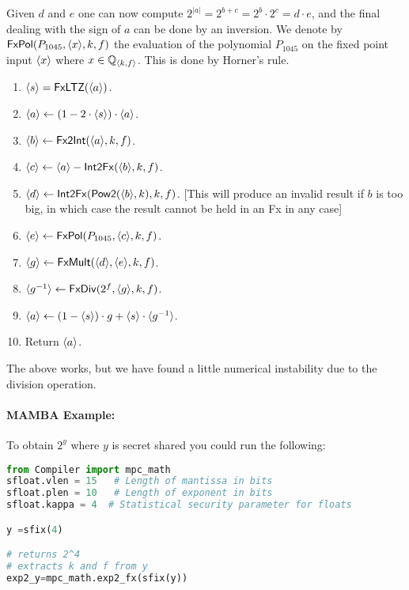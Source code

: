   Given $d$ and $e$ one can now compute
$2^{|a|}=2^{b+c}=2^b \cdot 2^c=d \cdot e$,
  and the final dealing with the sign of $a$ can
  be done by an inversion.
  We denote by $\mathsf{FxPol}(P_{1045},\langle x \rangle,k,f)$ the evaluation
  of the polynomial $P_{1045}$ on the fixed point input $\langle x \rangle$
  where $x \in {\mathbb{Q}}_{\langle k, f \rangle}$. This is done by Horner's rule.
  \begin{enumerate}
    \item $\langle s \rangle=\mathsf{FxLTZ}(\langle a \rangle)$.
    \item $\langle a \rangle \leftarrow (1-2 \cdot \langle s \rangle) \cdot \langle a \rangle$.
    \item $\langle b \rangle \leftarrow \mathsf{Fx2Int}(\langle a \rangle,k,f)$.
    \item $\langle c \rangle \leftarrow \langle a \rangle-\mathsf{Int2Fx}(\langle b \rangle,k,f)$.
    \item $\langle d \rangle \leftarrow \mathsf{Int2Fx}(\mathsf{Pow2}(\langle b \rangle,k),k,f)$. [This will produce an invalid result if $b$ is too big, in which case the result cannot be held in an Fx in any case]
    \item $\langle e \rangle \leftarrow \mathsf{FxPol}(P_{1045},\langle c \rangle,k,f)$.
    \item $\langle g \rangle \leftarrow \mathsf{FxMult}(\langle d \rangle,\langle e \rangle,k,f)$.
    \item $\langle g^{-1} \rangle \leftarrow \mathsf{FxDiv}(2^f,\langle g \rangle,k,f)$.
    \item $\langle a \rangle \leftarrow (1-\langle s \rangle) \cdot g+ \langle s \rangle \cdot \langle g^{-1} \rangle$.
    \item Return $\langle a \rangle$.
  \end{enumerate}
  The above works, but we have found a little numerical
  instability due to the division operation.
  \paragraph{MAMBA Example:} To obtain $2^y$ where $y$ is secret shared you could run the following:
  \begin{lstlisting}[language={python}]
from Compiler import mpc_math
sfloat.vlen = 15   # Length of mantissa in bits
sfloat.plen = 10   # Length of exponent in bits
sfloat.kappa = 4  # Statistical security parameter for floats

y =sfix(4)

# returns 2^4
# extracts k and f from y
exp2_y=mpc_math.exp2_fx(sfix(y))
\end{lstlisting}

